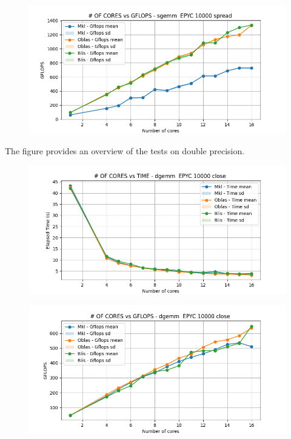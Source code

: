 \documentclass{article}
\begin{document}
\begin{figure}[H]
    \centering
    \includegraphics[width=\textwidth]{EPYC scalability deep/sgemm__EPYC_10000_spread_gflops.png}
\end{figure}

The figure provides an overview of the tests on double precision.
\begin{figure}[H]
    \centering
    \includegraphics[width=\textwidth]{EPYC scalability deep/dgemm__EPYC_10000_close_time.png}
\end{figure}

\begin{figure}[H]
    \centering
    \includegraphics[width=\textwidth]{EPYC scalability deep/dgemm__EPYC_10000_close_gflops.png}
\end{figure}
\end{document}
